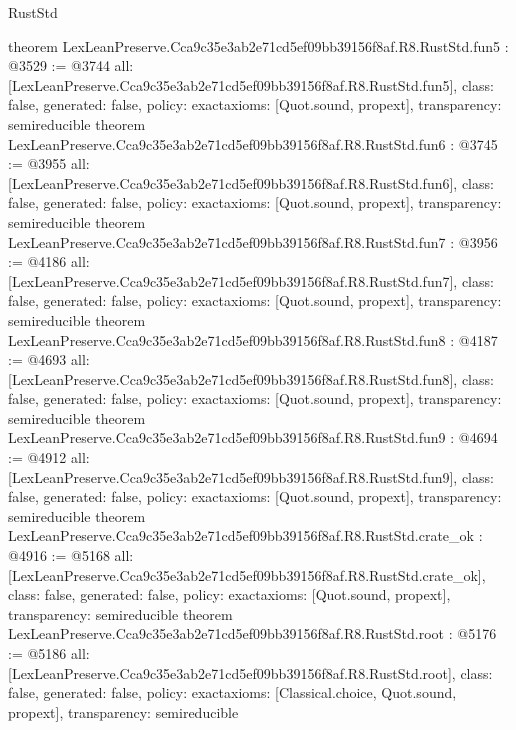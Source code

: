 \begin{lexlean}{RustStd}
\begin{coremodule}
{}
theorem LexLeanPreserve.Cca9c35e3ab2e71cd5ef09bb39156f8af.R8.RustStd.fun5 : @3529 := @3744 {
  all: [LexLeanPreserve.Cca9c35e3ab2e71cd5ef09bb39156f8af.R8.RustStd.fun5],
  class: false,
  generated: false,
  policy: exact{axioms: [Quot.sound, propext]},
  transparency: semireducible
}
theorem LexLeanPreserve.Cca9c35e3ab2e71cd5ef09bb39156f8af.R8.RustStd.fun6 : @3745 := @3955 {
  all: [LexLeanPreserve.Cca9c35e3ab2e71cd5ef09bb39156f8af.R8.RustStd.fun6],
  class: false,
  generated: false,
  policy: exact{axioms: [Quot.sound, propext]},
  transparency: semireducible
}
theorem LexLeanPreserve.Cca9c35e3ab2e71cd5ef09bb39156f8af.R8.RustStd.fun7 : @3956 := @4186 {
  all: [LexLeanPreserve.Cca9c35e3ab2e71cd5ef09bb39156f8af.R8.RustStd.fun7],
  class: false,
  generated: false,
  policy: exact{axioms: [Quot.sound, propext]},
  transparency: semireducible
}
theorem LexLeanPreserve.Cca9c35e3ab2e71cd5ef09bb39156f8af.R8.RustStd.fun8 : @4187 := @4693 {
  all: [LexLeanPreserve.Cca9c35e3ab2e71cd5ef09bb39156f8af.R8.RustStd.fun8],
  class: false,
  generated: false,
  policy: exact{axioms: [Quot.sound, propext]},
  transparency: semireducible
}
theorem LexLeanPreserve.Cca9c35e3ab2e71cd5ef09bb39156f8af.R8.RustStd.fun9 : @4694 := @4912 {
  all: [LexLeanPreserve.Cca9c35e3ab2e71cd5ef09bb39156f8af.R8.RustStd.fun9],
  class: false,
  generated: false,
  policy: exact{axioms: [Quot.sound, propext]},
  transparency: semireducible
}
theorem LexLeanPreserve.Cca9c35e3ab2e71cd5ef09bb39156f8af.R8.RustStd.crate_ok : @4916 := @5168 {
  all: [LexLeanPreserve.Cca9c35e3ab2e71cd5ef09bb39156f8af.R8.RustStd.crate_ok],
  class: false,
  generated: false,
  policy: exact{axioms: [Quot.sound, propext]},
  transparency: semireducible
}
theorem LexLeanPreserve.Cca9c35e3ab2e71cd5ef09bb39156f8af.R8.RustStd.root : @5176 := @5186 {
  all: [LexLeanPreserve.Cca9c35e3ab2e71cd5ef09bb39156f8af.R8.RustStd.root],
  class: false,
  generated: false,
  policy: exact{axioms: [Classical.choice, Quot.sound, propext]},
  transparency: semireducible
}


\end{coremodule}
\end{lexlean}
